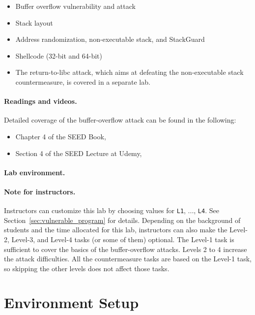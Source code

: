 \begin{itemize}[noitemsep]
\item Buffer overflow vulnerability and attack
\item Stack layout 
\item Address randomization, non-executable stack, and StackGuard
\item Shellcode (32-bit and 64-bit)
\item The return-to-libc attack, which aims at 
defeating the non-executable stack countermeasure, is covered 
in a separate lab.
\end{itemize}


\paragraph{Readings and videos.}
Detailed coverage of the buffer-overflow attack can be found in the following:

\begin{itemize}
\item Chapter 4 of the SEED Book, \seedbook
\item Section 4 of the SEED Lecture at Udemy, \seedcsvideo
\end{itemize}


\paragraph{Lab environment.} 
\seedenvironmentC


\paragraph{Note for instructors.} 
Instructors can customize this lab by choosing values
for \texttt{L1}, ..., \texttt{L4}. See    
Section~\ref{sec:vulnerable_program} for details.
Depending on the background of students and the time allocated 
for this lab, instructors can also make the 
Level-2, Level-3, and Level-4 tasks (or some of them) optional. 
The Level-1 task is sufficient to cover the basics of 
the buffer-overflow attacks. Levels 2 to 4
increase the attack difficulties. 
All the countermeasure tasks are based on the Level-1 task, 
so skipping the other levels does not affect those tasks. 


\section{Environment Setup}

